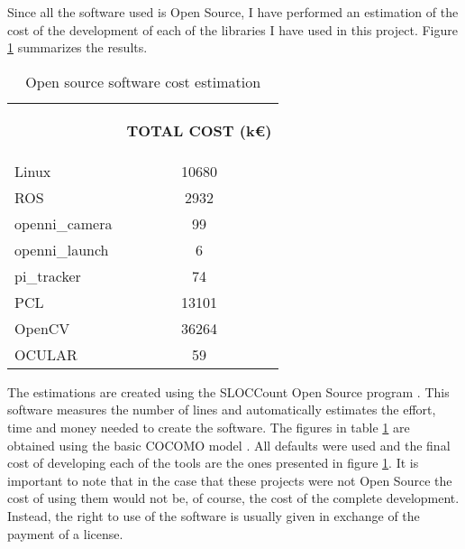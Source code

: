 		Since all the software used is Open Source, I have performed an estimation of the cost of the development of each of the libraries I have used in this project. 
		Figure \ref{estimations} summarizes the results.  






\begin{table}[H]
\centering
\begin{tabular} {l c}
\toprule
\addlinespace[3mm]
   \multicolumn{1}{c}{\begin{center}\textbf{SOFTWARE}\end{center}} &
   \multicolumn{1}{c}{\begin{center}\textbf{TOTAL COST (k\euro)}\end{center}} &
\\
\addlinespace[-3mm]
\midrule
Linux	&	10680%
	\\
ROS		&	2932%
\\
\hspace*{0.5cm}	openni\_camera	&	99%
\\
\hspace*{0.5cm}	openni\_launch	&	6%
\\
\hspace*{0.5cm}	pi\_tracker 	&	74%
\\
PCL	&	13101%
\\
OpenCV	&	36264	%
\\
OCULAR	&	59 	%
	\\

\bottomrule
\end{tabular}
\caption[Open source software cost estimation]{Open source software cost estimation}
\label{estimations}

\end{table}


		The estimations are created using the SLOCCount Open Source program \cite{sloccount}. 
		This software measures the number of lines and automatically estimates the effort, time and money needed to create the software. 
		The figures in table \ref{estimations} are obtained using the basic COCOMO model \cite{Boehm}. 
		All defaults were used and the final cost of developing each of the tools are the ones presented in figure \ref{estimations}. 
		It is important to note that in the case that these projects were not Open Source the cost of using them would not be, of course, the cost of the complete development. 
		Instead, the right to use of the software is usually given in exchange of the payment of a license. 
		\\

